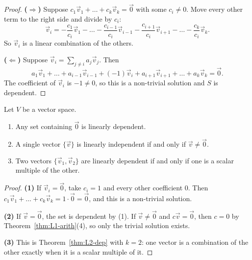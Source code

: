 \begin{proof}
\textbf{($\Longrightarrow$)} Suppose $c_1\vec{v}_1 + \dots + c_k\vec{v}_k = \vec{0}$ with some $c_i \neq 0$. Move every other term to the right side and divide by $c_i$:
\[
\vec{v}_i = -\frac{c_1}{c_i}\vec{v}_1 - \dots - \frac{c_{i-1}}{c_i}\vec{v}_{i-1} - \frac{c_{i+1}}{c_i}\vec{v}_{i+1} - \dots - \frac{c_k}{c_i}\vec{v}_k.
\]
So $\vec{v}_i$ is a linear combination of the others.

\textbf{($\Longleftarrow$)} Suppose $\vec{v}_i = \sum_{j \neq i} a_j\vec{v}_j$. Then
\[
a_1\vec{v}_1 + \dots + a_{i-1}\vec{v}_{i-1} + (-1)\vec{v}_i + a_{i+1}\vec{v}_{i+1} + \dots + a_k\vec{v}_k = \vec{0}.
\]
The coefficient of $\vec{v}_i$ is $-1 \neq 0$, so this is a non-trivial solution and $S$ is dependent.
\end{proof}

\begin{theorem}
Let $V$ be a vector space.
\begin{enumerate}
    \item Any set containing $\vec{0}$ is linearly dependent.
    \item A single vector $\{\vec{v}\}$ is linearly independent if and only if $\vec{v} \neq \vec{0}$.
    \item Two vectors $\{\vec{v}_1, \vec{v}_2\}$ are linearly dependent if and only if one is a scalar multiple of the other.
\end{enumerate}
\end{theorem}

\begin{proof}
\textbf{(1)} If $\vec{v}_i = \vec{0}$, take $c_i = 1$ and every other coefficient $0$. Then $c_1\vec{v}_1 + \dots + c_k\vec{v}_k = 1 \cdot \vec{0} = \vec{0}$, and this is a non-trivial solution.

\textbf{(2)} If $\vec{v} = \vec{0}$, the set is dependent by (1). If $\vec{v} \neq \vec{0}$ and $c\vec{v} = \vec{0}$, then $c = 0$ by Theorem~\ref{thm:L1-arith}(4), so only the trivial solution exists.

\textbf{(3)} This is Theorem~\ref{thm:L2-dep} with $k = 2$: one vector is a combination of the other exactly when it is a scalar multiple of it.
\end{proof}

